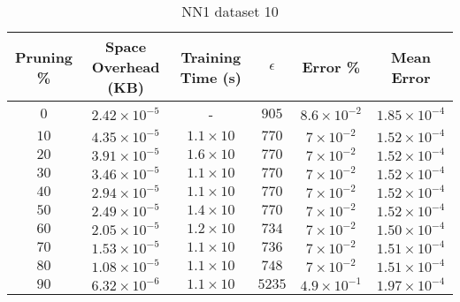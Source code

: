 \begin{adjustwidth}{0cm}{}
\begin{table}
\caption{NN1 dataset 10}\label{pr110}
\begin{tabular}{cccccc}
\hline
\toprule
Pruning \% & Space Overhead (KB) & Training Time (s) & $\epsilon$ & Error \% & Mean Error\\
\midrule
$0$ & $2.42 \times 10^{-5}$ & - & $905$ & $8.6 \times 10^{-2}$ & $1.85 \times 10^{-4}$\\
$10$ & $4.35 \times 10^{-5}$ & $1.1 \times 10$ & $770$ & $7 \times 10^{-2}$ & $1.52 \times 10^{-4}$\\
$20$ & $3.91 \times 10^{-5}$ & $1.6 \times 10$ & $770$ & $7 \times 10^{-2}$ & $1.52 \times 10^{-4}$\\
$30$ & $3.46 \times 10^{-5}$ & $1.1 \times 10$ & $770$ & $7 \times 10^{-2}$ & $1.52 \times 10^{-4}$\\
$40$ & $2.94 \times 10^{-5}$ & $1.1 \times 10$ & $770$ & $7 \times 10^{-2}$ & $1.52 \times 10^{-4}$\\
$50$ & $2.49 \times 10^{-5}$ & $1.4 \times 10$ & $770$ & $7 \times 10^{-2}$ & $1.52 \times 10^{-4}$\\
$60$ & $2.05 \times 10^{-5}$ & $1.2 \times 10$ & $734$ & $7 \times 10^{-2}$ & $1.50 \times 10^{-4}$\\
$70$ & $1.53 \times 10^{-5}$ & $1.1 \times 10$ & $736$ & $7 \times 10^{-2}$ & $1.51 \times 10^{-4}$\\
$80$ & $1.08 \times 10^{-5}$ & $1.1 \times 10$ & $748$ & $7 \times 10^{-2}$ & $1.51 \times 10^{-4}$\\
$90$ & $6.32 \times 10^{-6}$ & $1.1 \times 10$ & $5235$ & $4.9 \times 10^{-1}$ & $1.97 \times 10^{-4}$\\
\bottomrule
\end{tabular}
\end{table}
\end{adjustwidth}

